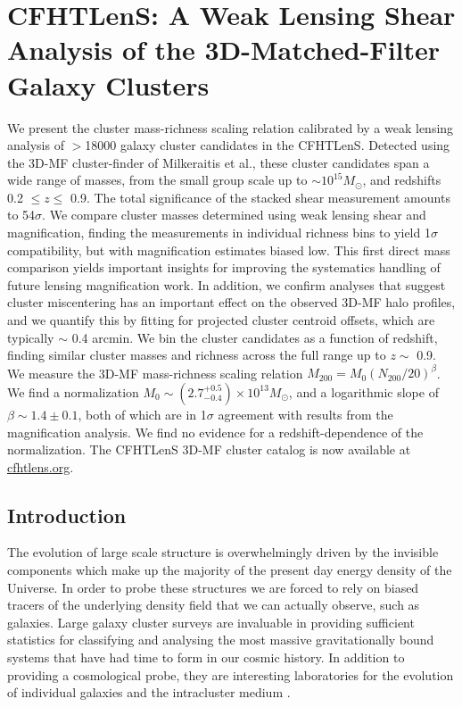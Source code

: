 \chapter{CFHTLenS: A Weak Lensing Shear Analysis of the 3D-Matched-Filter Galaxy Clusters}
\label{ch4}

We present the cluster mass-richness scaling relation calibrated by a weak lensing analysis of $>$18000 galaxy cluster candidates in the \acf{CFHTLenS}. Detected using the \acf{3D-MF} cluster-finder of Milkeraitis et al., these cluster candidates span a wide range of masses, from the small group scale up to $\sim10^{15} M_{\odot}$, and redshifts 0.2 $\leq z\leq$ 0.9. The total significance of the stacked shear measurement amounts to 54$\sigma$. We compare cluster masses determined using weak lensing shear and magnification, finding the measurements in individual richness bins to yield 1$\sigma$ compatibility, but with magnification estimates biased low. This first direct mass comparison yields important insights for improving the systematics handling of future lensing magnification work. In addition, we confirm analyses that suggest cluster miscentering has an important effect on the observed \ac{3D-MF} halo profiles, and we quantify this by fitting for projected cluster centroid offsets, which are typically $\sim$ 0.4 arcmin. We bin the cluster candidates as a function of redshift, finding similar cluster masses and richness across the full range up to $z \sim$ 0.9. We measure the \ac{3D-MF} mass-richness scaling relation $M_{200 } = M_0 (N_{200} / 20)^\beta$. We find a normalization $M_0 \sim (2.7^{+0.5}_{-0.4}) \times 10^{13} M_{\odot}$, and a logarithmic slope of $\beta \sim 1.4 \pm 0.1$, both of which are in 1$\sigma$ agreement with results from the magnification analysis. We find no evidence for a redshift-dependence of the normalization. The \ac{CFHTLenS} \ac{3D-MF} cluster catalog is now available at \url{cfhtlens.org}.



\section{Introduction}
\label{intro}
The evolution of large scale structure is overwhelmingly driven by the invisible components which make up the majority of the present day energy density of the Universe. In order to probe these structures we are forced to rely on biased tracers of the underlying density field that we can actually observe, such as galaxies. Large galaxy cluster surveys are invaluable in providing sufficient statistics for classifying and analysing the most massive gravitationally bound systems that have had time to form in our cosmic history. In addition to providing a cosmological probe, they are interesting laboratories for the evolution of individual galaxies and the intracluster medium \citep{Voit05}.

